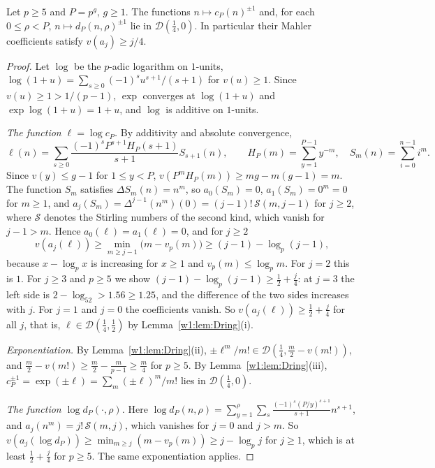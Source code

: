 \begin{proposition}\label{w1:prop:decay}
Let $p\ge5$ and $P=p^g$, $g\ge1$. The functions $n\mapsto c_P(n)^{\pm1}$ and, for each $0\le\rho<P$, $n\mapsto d_P(n,\rho)^{\pm1}$ lie in $\mathcal D(\tfrac14,0)$. In particular their Mahler coefficients satisfy $v(a_j)\ge j/4$.
\end{proposition}

\begin{proof}
Let $\log$ be the $p$-adic logarithm on $1$-units, $\log(1+u)=\sum_{s\ge0}(-1)^su^{s+1}/(s+1)$ for $v(u)\ge1$. Since $v(u)\ge1>1/(p-1)$, $\exp$ converges at $\log(1+u)$ and $\exp\log(1+u)=1+u$, and $\log$ is additive on $1$-units.

\emph{The function $\ell=\log c_P$.} By additivity and absolute convergence,
\[
\ell(n)=\sum_{s\ge0}\frac{(-1)^sP^{s+1}H_P(s+1)}{s+1}S_{s+1}(n),\qquad H_P(m)=\sum_{y=1}^{P-1}y^{-m},\quad S_m(n)=\sum_{i=0}^{n-1}i^m .
\]
Since $v(y)\le g-1$ for $1\le y<P$, $v(P^mH_P(m))\ge mg-m(g-1)=m$. The function $S_m$ satisfies $\Delta S_m(n)=n^m$, so $a_0(S_m)=0$, $a_1(S_m)=0^m=0$ for $m\ge1$, and $a_j(S_m)=\Delta^{j-1}(n^m)(0)=(j-1)!\,\mathcal S(m,j-1)$ for $j\ge2$, where $\mathcal S$ denotes the Stirling numbers of the second kind, which vanish for $j-1>m$. Hence $a_0(\ell)=a_1(\ell)=0$, and for $j\ge2$
\[
v(a_j(\ell))\ge\min_{m\ge j-1}\big(m-v_p(m)\big)\ge(j-1)-\log_p(j-1),
\]
because $x-\log_px$ is increasing for $x\ge1$ and $v_p(m)\le\log_pm$. For $j=2$ this is $1$. For $j\ge3$ and $p\ge5$ we show $(j-1)-\log_p(j-1)\ge\frac12+\frac j4$: at $j=3$ the left side is $2-\log_52>1.56\ge1.25$, and the difference of the two sides increases with $j$. For $j=1$ and $j=0$ the coefficients vanish. So $v(a_j(\ell))\ge\frac12+\frac j4$ for all $j$, that is, $\ell\in\mathcal D(\frac14,\frac12)$ by Lemma~\ref{w1:lem:Dring}(i).

\emph{Exponentiation.} By Lemma~\ref{w1:lem:Dring}(ii), $\pm\ell^m/m!\in\mathcal D(\frac14,\frac m2-v(m!))$, and $\frac m2-v(m!)\ge\frac m2-\frac m{p-1}\ge\frac m4$ for $p\ge5$. By Lemma~\ref{w1:lem:Dring}(iii), $c_P^{\pm1}=\exp(\pm\ell)=\sum_m(\pm\ell)^m/m!$ lies in $\mathcal D(\frac14,0)$.

\emph{The function $\log d_P(\cdot,\rho)$.} Here $\log d_P(n,\rho)=\sum_{y=1}^\rho\sum_s\frac{(-1)^s(P/y)^{s+1}}{s+1}n^{s+1}$, and $a_j(n^m)=j!\,\mathcal S(m,j)$, which vanishes for $j=0$ and $j>m$. So $v(a_j(\log d_P))\ge\min_{m\ge j}(m-v_p(m))\ge j-\log_pj$ for $j\ge1$, which is at least $\frac12+\frac j4$ for $p\ge5$. The same exponentiation applies.
\end{proof}



